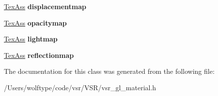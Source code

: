 \begin{DoxyCompactItemize}
\item 
\hypertarget{classvsr_1_1_material_ad8871b43707cd2f7acff12da992f5ece}{\hyperlink{structvsr_1_1_tex_ass}{Tex\-Ass} {\bfseries displacementmap}}\label{classvsr_1_1_material_ad8871b43707cd2f7acff12da992f5ece}

\item 
\hypertarget{classvsr_1_1_material_a464265f189067a505ac22f190fd5bf1a}{\hyperlink{structvsr_1_1_tex_ass}{Tex\-Ass} {\bfseries opacitymap}}\label{classvsr_1_1_material_a464265f189067a505ac22f190fd5bf1a}

\item 
\hypertarget{classvsr_1_1_material_ae4161117730a502a5ef870ed0142b80d}{\hyperlink{structvsr_1_1_tex_ass}{Tex\-Ass} {\bfseries lightmap}}\label{classvsr_1_1_material_ae4161117730a502a5ef870ed0142b80d}

\item 
\hypertarget{classvsr_1_1_material_aa25a922d898165ba781906252a8a9da0}{\hyperlink{structvsr_1_1_tex_ass}{Tex\-Ass} {\bfseries reflectionmap}}\label{classvsr_1_1_material_aa25a922d898165ba781906252a8a9da0}

\end{DoxyCompactItemize}


The documentation for this class was generated from the following file\-:\begin{DoxyCompactItemize}
\item 
/\-Users/wolftype/code/vsr/\-V\-S\-R/vsr\-\_\-gl\-\_\-material.\-h\end{DoxyCompactItemize}
